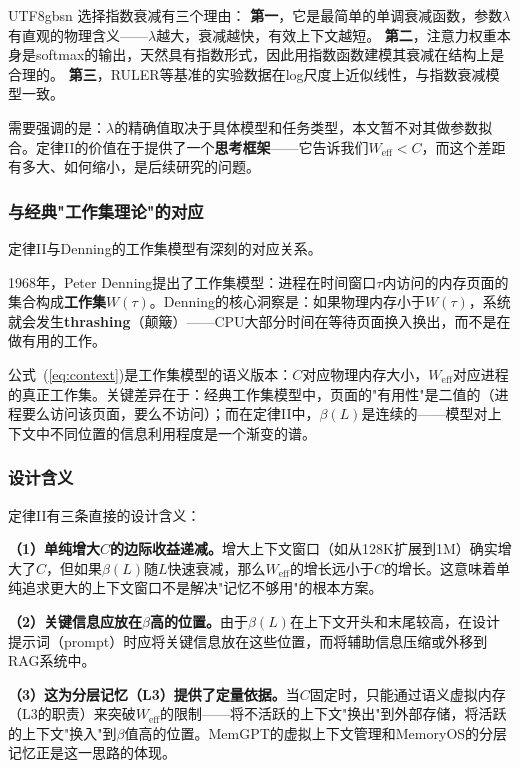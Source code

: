 \documentclass[11pt,a4paper]{article}
\begin{document}
\begin{CJK*}{UTF8}{gbsn}
选择指数衰减有三个理由：
\textbf{第一}，它是最简单的单调衰减函数，参数$\lambda$有直观的物理含义——$\lambda$越大，衰减越快，有效上下文越短。
\textbf{第二}，注意力权重本身是softmax的输出，天然具有指数形式，因此用指数函数建模其衰减在结构上是合理的。
\textbf{第三}，RULER等基准的实验数据在log尺度上近似线性\cite{ruler2024}，与指数衰减模型一致。

需要强调的是：$\lambda$的精确值取决于具体模型和任务类型，本文暂不对其做参数拟合。定律II的价值在于提供了一个\textbf{思考框架}——它告诉我们$W_{\mathrm{eff}} < C$，而这个差距有多大、如何缩小，是后续研究的问题。

\subsubsection{与经典"工作集理论"的对应}

定律II与Denning的工作集模型有深刻的对应关系\cite{denning1968thrashing}。

1968年，Peter Denning提出了工作集模型：进程在时间窗口$\tau$内访问的内存页面的集合构成\textbf{工作集}$W(\tau)$。Denning的核心洞察是：如果物理内存小于$W(\tau)$，系统就会发生\textbf{thrashing}（颠簸）——CPU大部分时间在等待页面换入换出，而不是在做有用的工作\cite{denning1968thrashing,denning2020workingset}。

公式~(\ref{eq:context})是工作集模型的语义版本：$C$对应物理内存大小，$W_{\mathrm{eff}}$对应进程的真正工作集。关键差异在于：经典工作集模型中，页面的"有用性"是二值的（进程要么访问该页面，要么不访问）；而在定律II中，$\beta(L)$是连续的——模型对上下文中不同位置的信息利用程度是一个渐变的谱。

\subsubsection{设计含义}

定律II有三条直接的设计含义：

\textbf{（1）单纯增大$C$的边际收益递减。}增大上下文窗口（如从128K扩展到1M）确实增大了$C$，但如果$\beta(L)$随$L$快速衰减，那么$W_{\mathrm{eff}}$的增长远小于$C$的增长。这意味着单纯追求更大的上下文窗口不是解决"记忆不够用"的根本方案。

\textbf{（2）关键信息应放在$\beta$高的位置。}由于$\beta(L)$在上下文开头和末尾较高，在设计提示词（prompt）时应将关键信息放在这些位置，而将辅助信息压缩或外移到RAG系统中。

\textbf{（3）这为分层记忆（L3）提供了定量依据。}当$C$固定时，只能通过语义虚拟内存（L3的职责）来突破$W_{\mathrm{eff}}$的限制——将不活跃的上下文"换出"到外部存储，将活跃的上下文"换入"到$\beta$值高的位置。MemGPT的虚拟上下文管理\cite{memgpt2023}和MemoryOS的分层记忆\cite{memoryos2025}正是这一思路的体现。


\end{CJK*}
\end{document}
